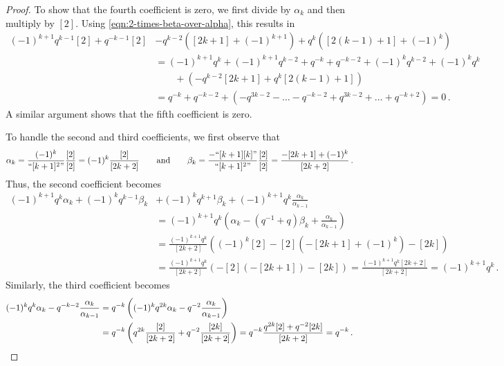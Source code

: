 \documentclass[10pt]{amsart}
\numberwithin{equation}{section}
\theoremstyle{definition}
\begin{document}
\begin{proof}
To show that the fourth coefficient is zero, we first divide by $\alpha_k$ and then multiply by $[2]$. 
Using \eqref{eqn:2-times-beta-over-alpha}, 
this results in 
\begin{align*}
(-1)^{k+1}q^{k-1}[2] + q^{-k-1}[2] &-q^{k-2}\left([2k+1] + (-1)^{k+1}\right) +q^{k}\left([2(k-1)+1] + (-1)^k\right) \\
	&=(-1)^{k+1}q^{k} + (-1)^{k+1}q^{k-2} + q^{-k} + q^{-k-2} + (-1)^kq^{k-2} + (-1)^kq^{k} \\
	& \qquad + \left(-q^{k-2}[2k+1] +q^{k}[2(k-1)+1] \right) \\
	&= q^{-k} + q^{-k-2} +\left(-q^{3k-2} - \dots - q^{-k-2} + q^{3k-2} + \dots + q^{-k+2}\right) = 0 \, .
\end{align*}
A similar argument shows that the fifth coefficient is zero.

To handle the second and third coefficients, we first observe that 
\[
\alpha_k =  \frac{(-1)^k}{``[k+1]^2"}\frac{[2]}{[2]} = (-1)^k\frac{[2]}{[2k+2]} 
\qquad \text{and} \qquad \beta_k = \frac{-``[k+1][k]"}{``[k+1]^2"}\frac{[2]}{[2]} = \frac{-[2k+1] + (-1)^k}{[2k+2]} \, .
\]
Thus, the second coefficient becomes
\begin{align*}
(-1)^{k+1}q^{k}\alpha_k + (-1)^kq^{k-1}\beta_k &+(-1)^{k}q^{k+1}\beta_k +(-1)^{k+1}q^{k}\frac{\alpha_k}{\alpha_{k-1}} \\
	&= (-1)^{k+1}q^k\left(\alpha_k -(q^{-1}+q)\beta_k +\frac{\alpha_k}{\alpha_{k-1}} \right) \\
	&= \frac{(-1)^{k+1}q^k}{[2k+2]}\left((-1)^k[2]-[2](-[2k+1] + (-1)^k)-[2k] \right)\\
	&= \frac{(-1)^{k+1}q^k}{[2k+2]}\left(-[2](-[2k+1])-[2k] \right)
	= \frac{(-1)^{k+1}q^k[2k+2]}{[2k+2]} = (-1)^{k+1}q^k \, .
\end{align*}
Similarly, the third coefficient becomes
\begin{align*}
(-1)^kq^{k}\alpha_k - q^{-k-2}\frac{\alpha_k}{\alpha_{k-1}} &= q^{-k}\left( (-1)^kq^{2k}\alpha_k - q^{-2}\frac{\alpha_k}{\alpha_{k-1}} \right) \\
	&= q^{-k}\left( q^{2k}\frac{[2]}{[2k+2]} + q^{-2}\frac{[2k]}{[2k+2]} \right)
	= q^{-k}\frac{q^{2k}[2] + q^{-2}[2k]}{[2k+2]}
	=q^{-k} \, . \qedhere
\end{align*}
\end{proof}

%
\end{document}
